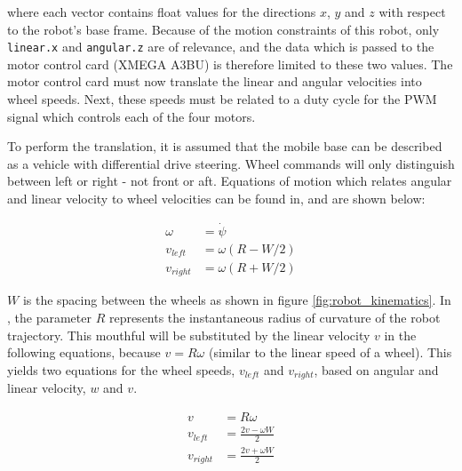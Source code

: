 where each vector contains float values for the directions $x$, $y$ and $z$ with respect to the robot's base frame. Because of the motion constraints of this robot, only \texttt{linear.x} and \texttt{angular.z} are of relevance, and the data which is passed to the motor control card (XMEGA A3BU) is therefore limited to these two values. The motor control card must now translate the linear and angular velocities into wheel speeds. Next, these speeds must be related to a duty cycle for the \ac{PWM} signal which controls each of the four motors.

To perform the translation, it is assumed that the mobile base can be described as a vehicle with differential drive steering. Wheel commands will only distinguish between left or right - not front or aft. Equations of motion which relates angular and linear velocity to wheel velocities can be found in\cite{cook2011mobile}, and are shown below:

\begin{subequations}\label{eq:subeqns}
  	\begin{align}
	  	\omega &= \dot{\psi} \\
	   	v_{left} &= \omega (R - W/2)\\
	   	v_{right} &= \omega (R + W/2) \label{eq:subeq2}
   	\end{align}
\end{subequations}

$W$ is the spacing between the wheels as shown in figure \ref{fig:robot_kinematics}. In \cite{cook2011mobile}, the parameter $R$ represents the instantaneous radius of curvature of the robot trajectory. This mouthful will be substituted by the linear velocity $v$ in the following equations, because $v = R\omega$ (similar to the linear speed of a wheel). This yields two equations for the wheel speeds, $v_{left}$ and $v_{right}$, based on angular and linear velocity, $w$ and $v$.

 \begin{subequations}%
 	\begin{align}
 	v &= R\omega \\
 	v_{left} &=  \frac{2v - \omega W}{2}\label {eq:subeq1}\\
 	v_{right} &= \frac{2v + \omega W}{2} \label{eq:subeq2}
 	\end{align}
 \end{subequations}

